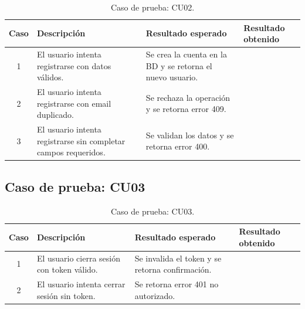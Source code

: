 \begin{table}[H]
\centering
\label{tab:cu02_white_test}
\renewcommand{\arraystretch}{1.3}
\begin{tabular}{|c|p{5cm}|p{6cm}|p{2.5cm}|}
\hline
\rowcolor[RGB]{217,217,217}
\textbf{Caso} & \textbf{Descripción} & \textbf{Resultado esperado} & \textbf{Resultado obtenido} \\
\hline

1 &
El usuario intenta registrarse con datos válidos. &
Se crea la cuenta en la BD y se retorna el nuevo usuario. &
 \\
\hline

2 &
El usuario intenta registrarse con email duplicado. &
Se rechaza la operación y se retorna error 409. &
 \\
\hline

3 &
El usuario intenta registrarse sin completar campos requeridos. &
Se validan los datos y se retorna error 400. &
 \\
\hline

\end{tabular}
\caption{Caso de prueba: CU02.}
\end{table}


\subsection{Caso de prueba: CU03}

\begin{table}[H]
\centering
\label{tab:cu03_white_test}
\renewcommand{\arraystretch}{1.3}
\begin{tabular}{|c|p{5cm}|p{6cm}|p{2.5cm}|}
\hline
\rowcolor[RGB]{217,217,217}
\textbf{Caso} & \textbf{Descripción} & \textbf{Resultado esperado} & \textbf{Resultado obtenido} \\
\hline

1 &
El usuario cierra sesión con token válido. &
Se invalida el token y se retorna confirmación. &
 \\
\hline

2 &
El usuario intenta cerrar sesión sin token. &
Se retorna error 401 no autorizado. &
 \\
\hline

\end{tabular}
\caption{Caso de prueba: CU03.}
\end{table}

